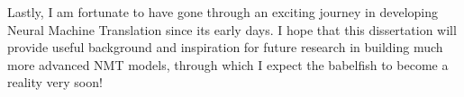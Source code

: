 Lastly, I am fortunate to have gone through an exciting journey in developing
Neural Machine Translation since its early days. I hope that this dissertation
will provide useful background and inspiration for future research in building
much more advanced NMT models, through which I expect the babelfish to become a
reality very soon!
